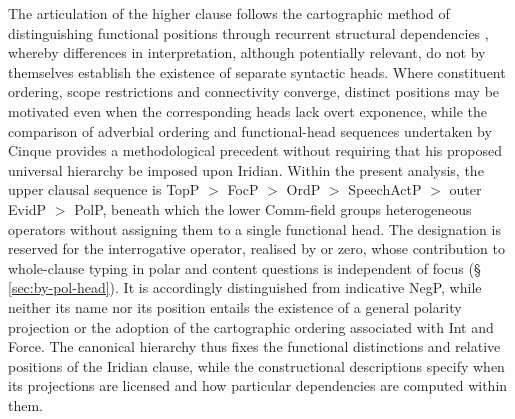 The articulation of the higher clause follows the cartographic method of
distinguishing functional positions through recurrent structural
dependencies \cites{rizzi1997}[§§2.1--2.2]{rizzibocci2017}, whereby
differences in interpretation, although potentially relevant, do not by
themselves establish the existence of separate syntactic heads. Where
constituent ordering, scope restrictions and connectivity converge, distinct
positions may be motivated even when the corresponding heads lack overt
exponence, while the comparison of adverbial ordering and functional-head
sequences undertaken by Cinque \cite{cinque1999} provides a methodological
precedent without requiring that his proposed universal hierarchy be imposed
upon Iridian. Within the present analysis, the upper clausal sequence is
TopP $>$ FocP $>$ OrdP $>$ SpeechActP $>$ outer EvidP $>$ PolP, beneath
which the lower Comm-field groups heterogeneous operators without assigning
them to a single functional head. The designation  is reserved for
the interrogative operator, realised by  or zero, whose contribution
to whole-clause typing in polar and content questions is independent of
focus (§\,\ref{sec:by-pol-head}). It is accordingly distinguished from
indicative NegP, while neither its name nor its position entails the
existence of a general polarity projection or the adoption of the
cartographic ordering associated with Int and Force. The canonical hierarchy
thus fixes the functional distinctions and relative positions of the Iridian
clause, while the constructional descriptions specify when its projections
are licensed and how particular dependencies are computed within them.

